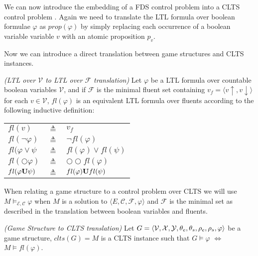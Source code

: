 We can now introduce the embedding of a FDS control problem \fdsControlProblemDef into a CLTS control problem \cltsCPEmbeddingDef.
Again we need to translate the LTL formula over boolean formulae $\varphi$ as $prop(\varphi)$ by simply  replacing each occurrence of a boolean variable variable $v$ with an atomic proposition $p_v$.





Now we can introduce a direct translation between game structures and CLTS instances.

\begin{definition}
	\label{def:fl_ltl} \emph{(LTL over $\mathcal{V}$ to LTL over $\mathcal{F}$ translation)} 
	Let $\varphi$ be a LTL formula over countable boolean variables $\mathcal{V}$, and if $\mathcal{F}$ is the minimal fluent set containing $v_f = \langle v\uparrow, v\downarrow \rangle$ for each $v \in \mathcal{V}$, $fl(\varphi)$ is an equivalent LTL formula over fluents according to the following inductive definition:\\
	
\begin{tabular}{ l c l }
	$fl(v)$ & $\triangleq$ & $v_f$\\	
	$fl(\neg \varphi)$ & $\triangleq$ & $\neg fl(\varphi)$\\
	$fl(\varphi \vee \psi$ & $\triangleq$ & $fl(\varphi) \vee fl(\psi)$\\
	$fl(\bigcirc \varphi)$ & $\triangleq$ & $\bigcirc\bigcirc fl(\varphi)$\\
	$fl(\varphi {\bf U} \psi)$ & $\triangleq$ & $fl(\varphi) {\bf U} fl(\psi)$\\
\end{tabular}	
\end{definition}

When relating a game structure to a control problem over CLTS we will use $M \models_{\mathcal{E,C}}\varphi$ when $M$ is a solution to $\langle E, \mathcal{C}, \mathcal{F}, \varphi \rangle$ and $\mathcal{F}$ is the minimal set as described in the translation between boolean variables and fluents.

\begin{definition}
	\label{def:gs_to_clts_translation} \emph{(Game Structure to CLTS translation)} 
Let $G =  \langle {\mathcal{V}}, {\mathcal{X}}, {\mathcal{Y}}, {\theta_e}, {\theta_s}, {\rho_e}, {\rho_s}, \varphi \rangle$ be a game structure, $clts(G)=M$ is a CLTS instance such that $G \models \varphi$ $\iff$ $M \models fl(\varphi)$.
\end{definition}

